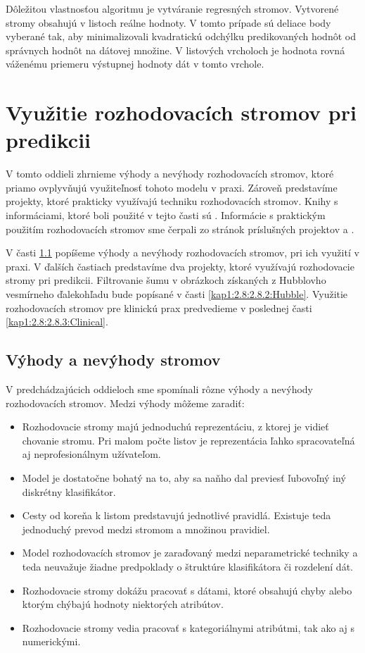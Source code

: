 Dôležitou vlastnosťou algoritmu je vytváranie regresných stromov. Vytvorené stromy obsahujú v listoch reálne hodnoty. V tomto prípade sú deliace body vyberané tak, aby minimalizovali kvadratickú odchýlku predikovaných hodnôt od správnych hodnôt na dátovej množine. V listových vrcholoch je hodnota rovná váženému priemeru výstupnej hodnoty dát v tomto vrchole.

\section{Využitie rozhodovacích stromov pri predikcii}\label{kap1:2.8:DTUsage}
V tomto oddieli zhrnieme výhody a nevýhody rozhodovacích stromov, ktoré priamo ovplyvňujú využiteľnosť tohoto modelu v praxi. Zároveň predstavíme projekty, ktoré prakticky využívajú techniku rozhodovacích stromov. Knihy s informáciami, ktoré boli použité v tejto časti sú \cite{kap1-DataMiningAndAnalysis,kap1-DataMiningForTrees}. Informácie s praktickým použitím rozhodovacích stromov sme čerpali zo stránok príslušných projektov \cite{online-astronomy} a \cite{online-psychoterapy}.

V časti \ref{kap1:2.8:2.8.1:AdvAndDis} popíšeme výhody a nevýhody rozhodovacích stromov, pri ich využití v praxi. V ďalších častiach predstavíme dva projekty, ktoré využívajú rozhodovacie stromy pri predikcii. Filtrovanie šumu v obrázkoch získaných z Hubblovho vesmírneho ďalekohľadu bude popísané v časti \ref{kap1:2.8:2.8.2:Hubble}. Využitie rozhodovacích stromov pre klinickú prax predvedieme v poslednej časti \ref{kap1:2.8:2.8.3:Clinical}.

\subsection{Výhody a nevýhody stromov}\label{kap1:2.8:2.8.1:AdvAndDis}
V predchádzajúcich oddieloch sme spomínali rôzne výhody a nevýhody rozhodovacích stromov. Medzi výhody môžeme zaradiť:
\begin{itemize}
\item Rozhodovacie stromy majú jednoduchú reprezentáciu, z ktorej je vidieť chovanie stromu. Pri malom počte listov je reprezentácia ľahko spracovateľná aj neprofesionálnym užívateľom.
\item Model je dostatočne bohatý na to, aby sa naňho dal previesť ľubovoľný iný diskrétny klasifikátor.
\item Cesty od koreňa k listom predstavujú jednotlivé pravidlá. Existuje teda jednoduchý prevod medzi stromom a množinou pravidiel.
\item Model rozhodovacích stromov je zaraďovaný medzi neparametrické techniky a teda neuvažuje žiadne predpoklady o štruktúre klasifikátora či rozdelení dát.
\item Rozhodovacie stromy dokážu pracovať s dátami, ktoré obsahujú chyby alebo ktorým chýbajú hodnoty niektorých atribútov.
\item Rozhodovacie stromy vedia pracovať s kategoriálnymi atribútmi, tak ako aj s numerickými.
\end{itemize}

